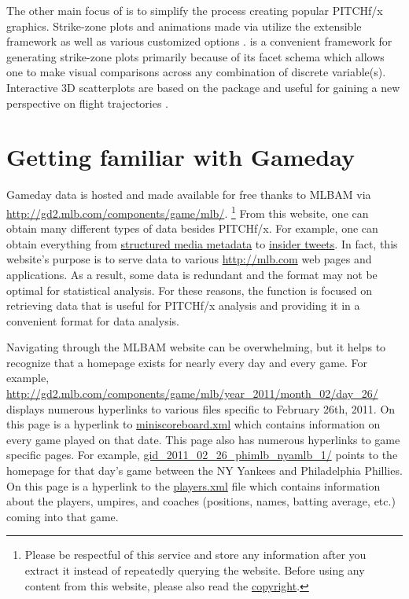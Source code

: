 \begin{article}
The other main focus of  is to simplify the process
creating popular PITCHf/x graphics. Strike-zone plots and animations
made via  utilize the extensible 
framework as well as various customized options \citep{ggplot2}.
 is a convenient framework for generating strike-zone
plots primarily because of its facet schema which allows one to make
visual comparisons across any combination of discrete variable(s).
Interactive 3D scatterplots are based on the  package
and useful for gaining a new perspective on flight trajectories \citep{rgl}.


\section{Getting familiar with Gameday}

Gameday data is hosted and made available for free thanks to MLBAM
via \url{http://gd2.mlb.com/components/game/mlb/}.%
\footnote{Please be respectful of this service and store any information after
you extract it instead of repeatedly querying the website. Before
using any content from this website, please also read the \href{http://gdx.mlb.com/components/copyright.txt}{copyright}.%
} From this website, one can obtain many different types of data besides
PITCHf/x. For example, one can obtain everything from \href{http://gd2.mlb.com/components/game/mlb/year_2013/month_07/day_16/gid_2013_07_16_aasmlb_nasmlb_1/media/instadium.xml}{structured media metadata}
to \href{http://gd2.mlb.com/components/game/mlb/twitter/anaInsiderTweets.xml}{insider tweets}.
In fact, this website's purpose is to serve data to various \url{http://mlb.com}
web pages and applications. As a result, some data is redundant and
the format may not be optimal for statistical analysis. For these
reasons, the  function is focused on retrieving data
that is useful for PITCHf/x analysis and providing it in a convenient
format for data analysis. 

Navigating through the MLBAM website can be overwhelming, but it helps
to recognize that a homepage exists for nearly every day and every
game. For example, \url{http://gd2.mlb.com/components/game/mlb/year_2011/month_02/day_26/}
displays numerous hyperlinks to various files specific to February
26th, 2011. On this page is a hyperlink to \href{http://gd2.mlb.com/components/game/mlb/year_2011/month_02/day_26/miniscoreboard.xml}{miniscoreboard.xml}
which contains information on every game played on that date. This
page also has numerous hyperlinks to game specific pages. For example,
\href{http://gd2.mlb.com/components/game/mlb/year_2011/month_02/day_26/gid_2011_02_26_phimlb_nyamlb_1/}{gid\_2011\_02\_26\_phimlb\_nyamlb\_1/}
points to the homepage for that day's game between the NY Yankees
and Philadelphia Phillies. On this page is a hyperlink to the \href{http://gd2.mlb.com/components/game/mlb/year_2011/month_02/day_26/gid_2011_02_26_phimlb_nyamlb_1/players.xml}{players.xml}
file which contains information about the players, umpires, and coaches
(positions, names, batting average, etc.) coming into that game. 


\end{article}
